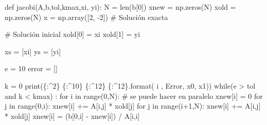 \documentclass[
  letterpaper,
  DIV=11,
  numbers=noendperiod]{scrreprt}
\newenvironment{Shaded}{\begin{snugshade}}{\end{snugshade}}
\newcommand{\BuiltInTok}[1]{\textcolor[rgb]{0.00,0.23,0.31}{#1}}
\newcommand{\CommentTok}[1]{\textcolor[rgb]{0.37,0.37,0.37}{#1}}
\newcommand{\ControlFlowTok}[1]{\textcolor[rgb]{0.00,0.23,0.31}{#1}}
\newcommand{\DecValTok}[1]{\textcolor[rgb]{0.68,0.00,0.00}{#1}}
\newcommand{\KeywordTok}[1]{\textcolor[rgb]{0.00,0.23,0.31}{#1}}
\newcommand{\NormalTok}[1]{\textcolor[rgb]{0.00,0.23,0.31}{#1}}
\newcommand{\OperatorTok}[1]{\textcolor[rgb]{0.37,0.37,0.37}{#1}}
\newcommand{\SpecialCharTok}[1]{\textcolor[rgb]{0.37,0.37,0.37}{#1}}
\newcommand{\StringTok}[1]{\textcolor[rgb]{0.13,0.47,0.30}{#1}}
\begin{document}
\begin{Shaded}
\begin{Highlighting}[]
\KeywordTok{def}\NormalTok{ jacobi(A,b,tol,kmax,xi, yi):}
\NormalTok{    N }\OperatorTok{=} \BuiltInTok{len}\NormalTok{(b[}\DecValTok{0}\NormalTok{])}
\NormalTok{    xnew }\OperatorTok{=}\NormalTok{ np.zeros(N)}
\NormalTok{    xold }\OperatorTok{=}\NormalTok{ np.zeros(N)}
\NormalTok{    x }\OperatorTok{=}\NormalTok{ np.array([}\DecValTok{2}\NormalTok{, }\OperatorTok{{-}}\DecValTok{2}\NormalTok{]) }\CommentTok{\# Solución exacta}
    
    \CommentTok{\# Solución inicial}
\NormalTok{    xold[}\DecValTok{0}\NormalTok{] }\OperatorTok{=}\NormalTok{ xi}
\NormalTok{    xold[}\DecValTok{1}\NormalTok{] }\OperatorTok{=}\NormalTok{ yi}
    
\NormalTok{    xs }\OperatorTok{=}\NormalTok{ [xi]}
\NormalTok{    ys }\OperatorTok{=}\NormalTok{ [yi]}
    
\NormalTok{    e }\OperatorTok{=} \DecValTok{10}
\NormalTok{    error }\OperatorTok{=}\NormalTok{ [] }
    
\NormalTok{    k }\OperatorTok{=} \DecValTok{0}
    \BuiltInTok{print}\NormalTok{(}\StringTok{\textquotesingle{}}\SpecialCharTok{\{:\^{}2\}}\StringTok{ }\SpecialCharTok{\{:\^{}10\}}\StringTok{ }\SpecialCharTok{\{:\^{}12\}}\StringTok{ }\SpecialCharTok{\{:\^{}12\}}\StringTok{\textquotesingle{}}\NormalTok{.}\BuiltInTok{format}\NormalTok{(}\StringTok{\textquotesingle{} i \textquotesingle{}}\NormalTok{, }\StringTok{\textquotesingle{}Error\textquotesingle{}}\NormalTok{, }\StringTok{\textquotesingle{}x0\textquotesingle{}}\NormalTok{, }\StringTok{\textquotesingle{}x1\textquotesingle{}}\NormalTok{))}
    \ControlFlowTok{while}\NormalTok{(e }\OperatorTok{\textgreater{}}\NormalTok{ tol }\KeywordTok{and}\NormalTok{ k }\OperatorTok{\textless{}}\NormalTok{ kmax) :}
        \ControlFlowTok{for}\NormalTok{ i }\KeywordTok{in} \BuiltInTok{range}\NormalTok{(}\DecValTok{0}\NormalTok{,N): }\CommentTok{\# se puede hacer en paralelo}
\NormalTok{            xnew[i] }\OperatorTok{=} \DecValTok{0}
            \ControlFlowTok{for}\NormalTok{ j }\KeywordTok{in} \BuiltInTok{range}\NormalTok{(}\DecValTok{0}\NormalTok{,i):}
\NormalTok{                xnew[i] }\OperatorTok{+=}\NormalTok{ A[i,j] }\OperatorTok{*}\NormalTok{ xold[j]}
            \ControlFlowTok{for}\NormalTok{ j }\KeywordTok{in} \BuiltInTok{range}\NormalTok{(i}\OperatorTok{+}\DecValTok{1}\NormalTok{,N):}
\NormalTok{                xnew[i] }\OperatorTok{+=}\NormalTok{ A[i,j] }\OperatorTok{*}\NormalTok{ xold[j]                }
\NormalTok{            xnew[i] }\OperatorTok{=}\NormalTok{ (b[}\DecValTok{0}\NormalTok{,i] }\OperatorTok{{-}}\NormalTok{ xnew[i]) }\OperatorTok{/}\NormalTok{ A[i,i]}
        

\end{Highlighting}
\end{Shaded}
\end{document}
